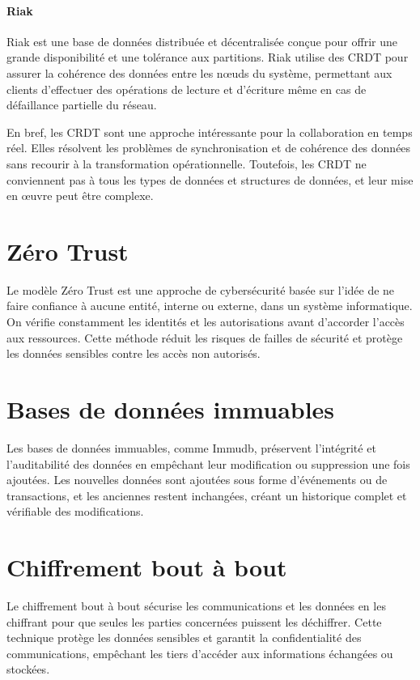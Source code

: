 \paragraph{Riak}

Riak est une base de données distribuée et décentralisée conçue pour offrir une grande disponibilité et une tolérance aux partitions. Riak utilise des CRDT pour assurer la cohérence des données entre les nœuds du système, permettant aux clients d'effectuer des opérations de lecture et d'écriture même en cas de défaillance partielle du réseau.

En bref, les CRDT sont une approche intéressante pour la collaboration en temps réel. Elles résolvent les problèmes de synchronisation et de cohérence des données sans recourir à la transformation opérationnelle. Toutefois, les CRDT ne conviennent pas à tous les types de données et structures de données, et leur mise en œuvre peut être complexe.

\section{Zéro Trust}
Le modèle Zéro Trust est une approche de cybersécurité basée sur l'idée de ne faire confiance à aucune entité, interne ou externe, dans un système informatique. On vérifie constamment les identités et les autorisations avant d'accorder l'accès aux ressources. Cette méthode réduit les risques de failles de sécurité et protège les données sensibles contre les accès non autorisés.

\section{Bases de données immuables}
Les bases de données immuables, comme Immudb, préservent l'intégrité et l'auditabilité des données en empêchant leur modification ou suppression une fois ajoutées. Les nouvelles données sont ajoutées sous forme d'événements ou de transactions, et les anciennes restent inchangées, créant un historique complet et vérifiable des modifications.

\section{Chiffrement bout à bout}
Le chiffrement bout à bout sécurise les communications et les données en les chiffrant pour que seules les parties concernées puissent les déchiffrer. Cette technique protège les données sensibles et garantit la confidentialité des communications, empêchant les tiers d'accéder aux informations échangées ou stockées.

